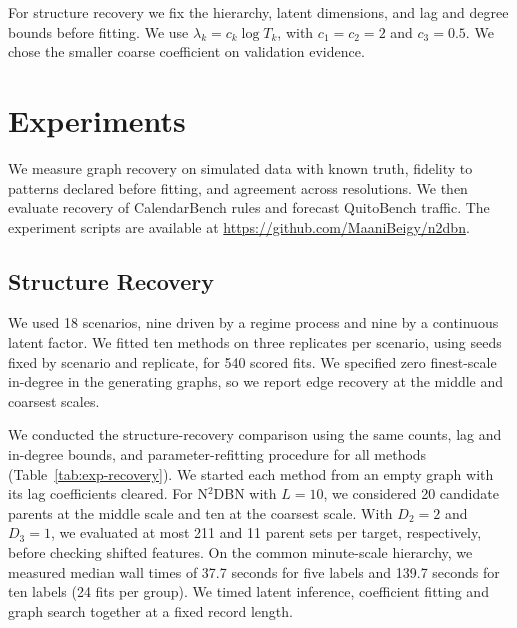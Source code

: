 \documentclass[sigconf]{acmart}
\begin{document}
For structure recovery we fix the hierarchy, latent dimensions, and lag and degree bounds before fitting. We use \(\lambda_k=c_k\log T_k\), with \(c_1=c_2=2\) and \(c_3=0.5\). We chose the smaller coarse coefficient on validation evidence.

\section{Experiments}
\label{sec:experiments}

We measure graph recovery on simulated data with known truth, fidelity to patterns declared before fitting, and agreement across resolutions. We then evaluate recovery of CalendarBench rules and forecast QuitoBench traffic. The experiment scripts are available at \url{https://github.com/MaaniBeigy/n2dbn}.

\subsection{Structure Recovery}
\label{sec:exp:recovery}

We used 18 scenarios, nine driven by a regime process and nine by a continuous latent factor. We fitted ten methods on three replicates per scenario, using seeds fixed by scenario and replicate, for 540 scored fits. We specified zero finest-scale in-degree in the generating graphs, so we report edge recovery at the middle and coarsest scales.

We conducted the structure-recovery comparison using the same counts, lag and in-degree bounds, and parameter-refitting procedure for all methods (Table~\ref{tab:exp-recovery}). We started each method from an empty graph with its lag coefficients cleared. For N$^2$DBN with \(L=10\), we considered 20 candidate parents at the middle scale and ten at the coarsest scale. With \(D_2=2\) and \(D_3=1\), we evaluated at most 211 and 11 parent sets per target, respectively, before checking shifted features. On the common minute-scale hierarchy, we measured median wall times of 37.7 seconds for five labels and 139.7 seconds for ten labels (24 fits per group). We timed latent inference, coefficient fitting and graph search together at a fixed record length.
\end{document}
